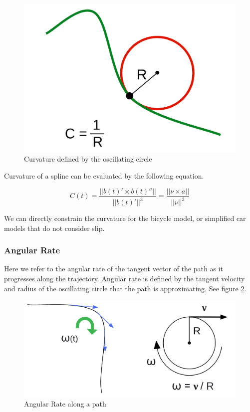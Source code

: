 \documentclass{article}
\begin{document}
\begin{figure}[h]
\begin{center}
\includegraphics[scale=.13]{Curvature.png}
\end{center}
\caption{Curvature defined by the oscillating circle}
\label{Fig:Curvature}
\end{figure}

Curvature of a spline can be evaluated by the following equation.

\begin{equation} \label{eq:Curvature}
    C(t) = \frac{||b(t)' \times b(t)''||}{||b(t)'||^3} = \frac{||\nu \times a||}{||\nu||^3}
\end{equation}

We can directly constrain the curvature for the bicycle model, or simplified car models that do not consider slip.

\subsubsection{Angular Rate}

Here we refer to the angular rate of the tangent vector of the path as it progresses along the trajectory. Angular rate is defined by the tangent velocity and radius of the oscillating circle that the path is approximating. See figure \ref{Fig:AngularRate.png}.

\begin{figure}[h]
\centering
\includegraphics[scale=.12]{AngularRate.png}
\caption{Angular Rate along a path}
\label{Fig:AngularRate.png}
\end{figure}
\end{document}
